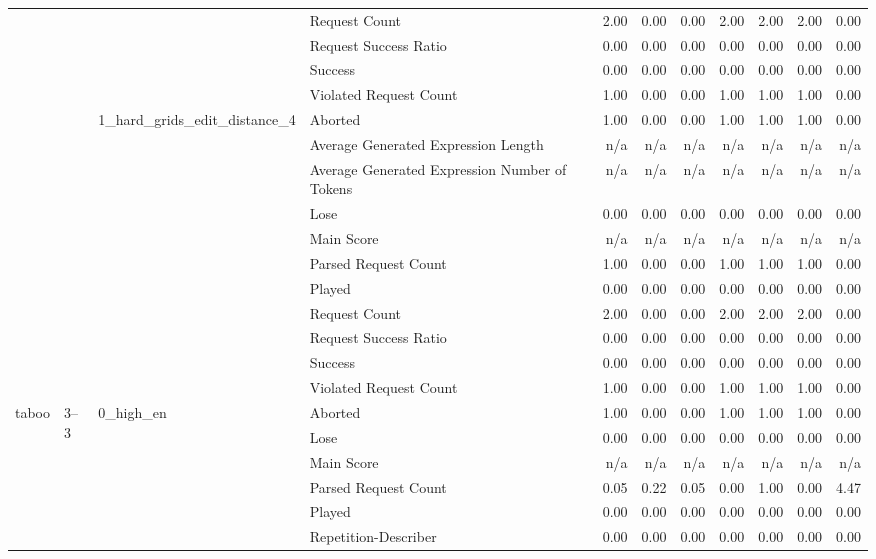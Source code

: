 \begin{tabular}{llllrrrrrrr}
 &  &  & Request Count & 2.00 & 0.00 & 0.00 & 2.00 & 2.00 & 2.00 & 0.00 \\
 &  &  & Request Success Ratio & 0.00 & 0.00 & 0.00 & 0.00 & 0.00 & 0.00 & 0.00 \\
 &  &  & Success & 0.00 & 0.00 & 0.00 & 0.00 & 0.00 & 0.00 & 0.00 \\
 &  &  & Violated Request Count & 1.00 & 0.00 & 0.00 & 1.00 & 1.00 & 1.00 & 0.00 \\
\cline{3-11}
 &  & \multirow[t]{11}{*}{1_hard_grids_edit_distance_4} & Aborted & 1.00 & 0.00 & 0.00 & 1.00 & 1.00 & 1.00 & 0.00 \\
 &  &  & Average Generated Expression Length & n/a & n/a & n/a & n/a & n/a & n/a & n/a \\
 &  &  & Average Generated Expression Number of Tokens & n/a & n/a & n/a & n/a & n/a & n/a & n/a \\
 &  &  & Lose & 0.00 & 0.00 & 0.00 & 0.00 & 0.00 & 0.00 & 0.00 \\
 &  &  & Main Score & n/a & n/a & n/a & n/a & n/a & n/a & n/a \\
 &  &  & Parsed Request Count & 1.00 & 0.00 & 0.00 & 1.00 & 1.00 & 1.00 & 0.00 \\
 &  &  & Played & 0.00 & 0.00 & 0.00 & 0.00 & 0.00 & 0.00 & 0.00 \\
 &  &  & Request Count & 2.00 & 0.00 & 0.00 & 2.00 & 2.00 & 2.00 & 0.00 \\
 &  &  & Request Success Ratio & 0.00 & 0.00 & 0.00 & 0.00 & 0.00 & 0.00 & 0.00 \\
 &  &  & Success & 0.00 & 0.00 & 0.00 & 0.00 & 0.00 & 0.00 & 0.00 \\
 &  &  & Violated Request Count & 1.00 & 0.00 & 0.00 & 1.00 & 1.00 & 1.00 & 0.00 \\
\cline{1-11} \cline{2-11} \cline{3-11}
\multirow[t]{363}{*}{taboo} & \multirow[t]{33}{*}{3--3} & \multirow[t]{11}{*}{0_high_en} & Aborted & 1.00 & 0.00 & 0.00 & 1.00 & 1.00 & 1.00 & 0.00 \\
 &  &  & Lose & 0.00 & 0.00 & 0.00 & 0.00 & 0.00 & 0.00 & 0.00 \\
 &  &  & Main Score & n/a & n/a & n/a & n/a & n/a & n/a & n/a \\
 &  &  & Parsed Request Count & 0.05 & 0.22 & 0.05 & 0.00 & 1.00 & 0.00 & 4.47 \\
 &  &  & Played & 0.00 & 0.00 & 0.00 & 0.00 & 0.00 & 0.00 & 0.00 \\
 &  &  & Repetition-Describer & 0.00 & 0.00 & 0.00 & 0.00 & 0.00 & 0.00 & 0.00 \\

\end{tabular}
